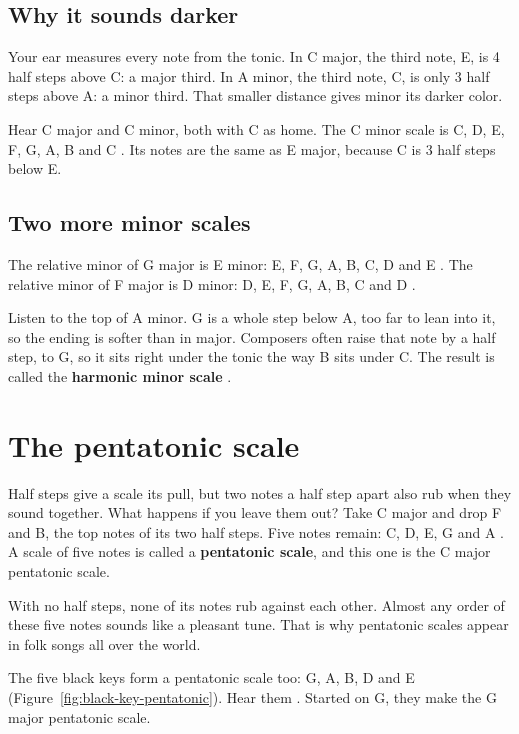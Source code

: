 \subsection*{Why it sounds darker}

Your ear measures every note from the tonic. In C major, the third note, E, is 4 half steps above C: a major third. In A minor, the third note, C, is only 3 half steps above A: a minor third. That smaller distance gives minor its darker color.

Hear C major and C minor, both with C as home. The C minor scale is C, D, E\fl, F, G, A\fl, B\fl{} and C . Its notes are the same as E\fl{} major, because C is 3 half steps below E\fl.

\subsection*{Two more minor scales}

The relative minor of G major is E minor: E, F\sh, G, A, B, C, D and E . The relative minor of F major is D minor: D, E, F, G, A, B\fl, C and D .

Listen to the top of A minor. G is a whole step below A, too far to lean into it, so the ending is softer than in major. Composers often raise that note by a half step, to G\sh, so it sits right under the tonic the way B sits under C. The result is called the \textbf{harmonic minor scale} .

\section{The pentatonic scale}

Half steps give a scale its pull, but two notes a half step apart also rub when they sound together. What happens if you leave them out? Take C major and drop F and B, the top notes of its two half steps. Five notes remain: C, D, E, G and A . A scale of five notes is called a \textbf{pentatonic scale}, and this one is the C major pentatonic scale.

With no half steps, none of its notes rub against each other. Almost any order of these five notes sounds like a pleasant tune. That is why pentatonic scales appear in folk songs all over the world.

The five black keys form a pentatonic scale too: G\fl, A\fl, B\fl, D\fl{} and E\fl{} (Figure~\ref{fig:black-key-pentatonic}). Hear them . Started on G\fl, they make the G\fl{} major pentatonic scale.

